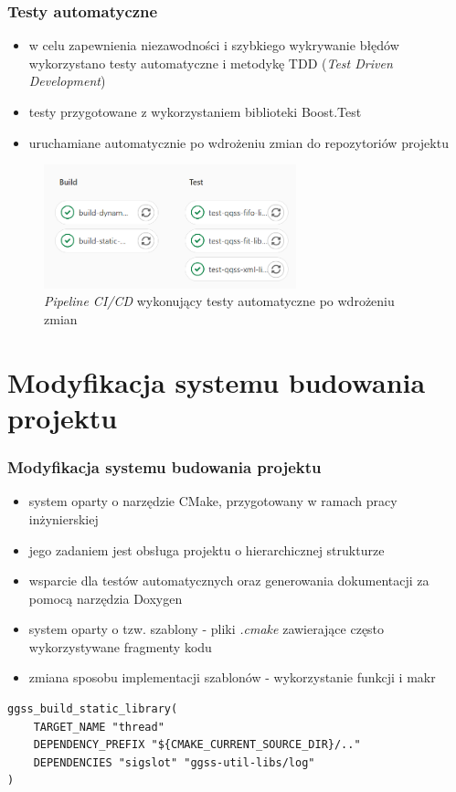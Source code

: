 \documentclass[10pt]{beamer}
\begin{document}
\begin{frame}
\frametitle{Testy automatyczne}
\begin{itemize}
    \item w celu zapewnienia niezawodności i szybkiego wykrywanie błędów wykorzystano testy automatyczne i metodykę TDD (\emph{Test Driven Development})
    \item testy przygotowane z wykorzystaniem biblioteki Boost.Test
    \item uruchamiane automatycznie po wdrożeniu zmian do repozytoriów projektu
\end{itemize}
\begin{figure}
\includegraphics[width=0.65\textwidth]{static/pipeline.png}
\caption{\emph{Pipeline CI/CD} wykonujący testy automatyczne po wdrożeniu zmian}
\end{figure}
\end{frame}


\section{Modyfikacja systemu budowania projektu}

\begin{frame}[fragile]
\frametitle{Modyfikacja systemu budowania projektu}
\begin{itemize}
    \item system oparty o narzędzie CMake, przygotowany w ramach pracy inżynierskiej
    \item jego zadaniem jest obsługa projektu o hierarchicznej strukturze
    \item wsparcie dla testów automatycznych oraz generowania dokumentacji za pomocą narzędzia Doxygen
    \item system oparty o tzw. szablony - pliki \emph{.cmake} zawierające często wykorzystywane fragmenty kodu
    \item zmiana sposobu implementacji szablonów - wykorzystanie funkcji i makr
\end{itemize}
\begin{lstlisting}[caption={}]
ggss_build_static_library(
    TARGET_NAME "thread"
    DEPENDENCY_PREFIX "${CMAKE_CURRENT_SOURCE_DIR}/.."
    DEPENDENCIES "sigslot" "ggss-util-libs/log"
)
\end{lstlisting}
\end{frame}
\end{document}

